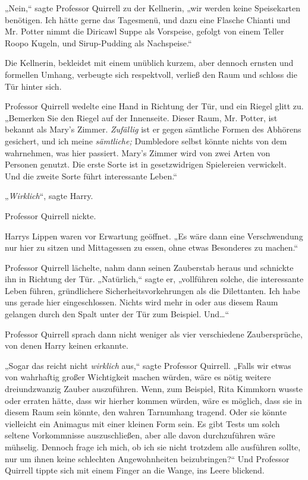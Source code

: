 {„Nein,“ sagte Professor Quirrell zu der Kellnerin, „wir werden keine Speisekarten benötigen. Ich hätte gerne das Tagesmenü, und dazu eine Flasche Chianti und Mr. Potter nimmt die Diricawl Suppe als Vorspeise, gefolgt von einem Teller Roopo Kugeln, und Sirup-Pudding als Nachspeise.“

Die Kellnerin, bekleidet mit einem unüblich kurzem, aber dennoch ernsten und formellen Umhang, verbeugte sich respektvoll, verließ den Raum und schloss die Tür hinter sich.

Professor Quirrell wedelte eine Hand in Richtung der Tür, und ein Riegel glitt zu. „Bemerken Sie den Riegel auf der Innenseite. Dieser Raum, Mr. Potter, ist bekannt als Mary's Zimmer. \emph{Zufällig} ist er gegen sämtliche Formen des Abhörens gesichert, und ich meine \emph{sämtliche;} Dumbledore selbst könnte nichts von dem wahrnehmen, was hier passiert. Mary's Zimmer wird von zwei Arten von Personen genutzt. Die erste Sorte ist in gesetzwidrigen Spielereien verwickelt. Und die zweite Sorte führt interessante Leben.“

„\emph{Wirklich}“, sagte Harry.

Professor Quirrell nickte.

Harrys Lippen waren vor Erwartung geöffnet. „Es wäre dann eine Verschwendung nur hier zu sitzen und Mittagessen zu essen, ohne etwas Besonderes zu machen.“

Professor Quirrell lächelte, nahm dann seinen Zauberstab heraus und schnickte ihn in Richtung der Tür. „Natürlich,“ sagte er, „vollführen solche, die interessante Leben führen, gründlichere Sicherheitsvorkehrungen als die Dilettanten. Ich habe uns gerade hier eingeschlossen. Nichts wird mehr in oder aus diesem Raum gelangen \later durch den Spalt unter der Tür zum Beispiel. Und…“

Professor Quirrell sprach dann nicht weniger als vier verschiedene Zaubersprüche, von denen Harry keinen erkannte.

„Sogar das reicht nicht \emph{wirklich} aus,“ sagte Professor Quirrell. „Falls wir etwas von wahrhaftig großer Wichtigkeit machen würden, wäre es nötig weitere dreiundzwanzig Zauber auszuführen. Wenn, zum Beispiel, Rita Kimmkorn wusste oder erraten hätte, dass wir hierher kommen würden, wäre es möglich, dass sie in diesem Raum sein könnte, den wahren Tarnumhang tragend. Oder sie könnte vielleicht ein Animagus mit einer kleinen Form sein. Es gibt Tests um solch seltene Vorkommnisse auszuschließen, aber alle davon durchzuführen wäre mühselig. Dennoch frage ich mich, ob ich sie nicht trotzdem alle ausführen sollte, nur um ihnen keine schlechten Angewohnheiten beizubringen?“ Und Professor Quirrell tippte sich mit einem Finger an die Wange, ins Leere blickend.

}
